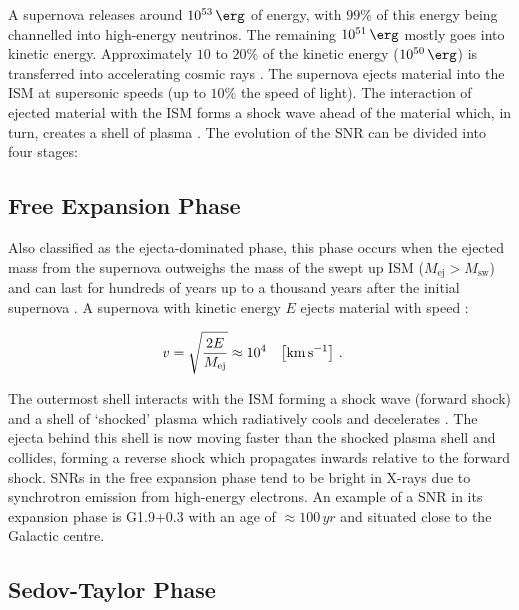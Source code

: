 A supernova releases around $10^{53}\,\ergs$ of energy, with $99\%$ of this energy being channelled into high-energy neutrinos. The remaining $10^{51}\,\ergs$ mostly goes into kinetic energy. Approximately $10$ to $20\%$ of the kinetic energy ($10^{50}\,\ergs$) is transferred into accelerating cosmic rays \citep{2012SSRv..173..369H}. The supernova ejects material into the ISM at supersonic speeds (up to $10\%$ the speed of light). The interaction of ejected material with the ISM forms a shock wave ahead of the material which, in turn, creates a shell of plasma \citep{alma9928040781501811}. The evolution of the SNR can be divided into four stages:

\subsection{Free Expansion Phase}

Also classified as the ejecta-dominated phase, this phase occurs when the ejected mass from the supernova outweighs the mass of the swept up ISM ($M_\text{ej}>M_\text{sw}$) and can last for hundreds of years up to a thousand years after the initial supernova \citep{2008ARA&A..46...89R}. A supernova with kinetic energy $E$ ejects material with speed \citep{2022arXiv221102217B}:

\begin{equation}
    \begin{aligned}
        v&=\sqrt{\frac{2E}{M_\text{ej}}}\approx 10^4\quad\qty[\si{\kilo\meter\per\second}]\text{ .} 
    \end{aligned}
\end{equation}

The outermost shell interacts with the ISM forming a shock wave (forward shock) and a shell of `shocked' plasma which radiatively cools and decelerates  \citep{1972ARA&A..10..129W}. The ejecta behind this shell is now moving faster than the shocked plasma shell and collides, forming a reverse shock which propagates inwards relative to the forward shock. SNRs in the free expansion phase tend to be bright in X-rays due to synchrotron emission from high-energy electrons. An example of a SNR in its expansion phase is \mbox{G1.9+0.3} with an age of  $\approx 100\,\si{yr}$ and situated close to the Galactic centre. \citep{2008ApJ...680L..41R}

\subsection{Sedov-Taylor Phase}

